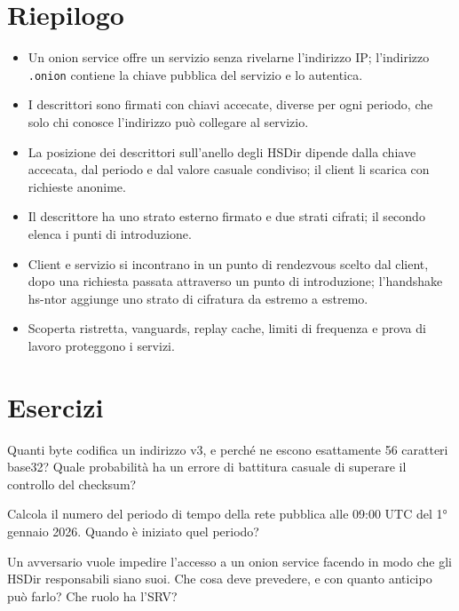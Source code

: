 \section*{Riepilogo}
\begin{itemize}
  \item Un onion service offre un servizio senza rivelarne l'indirizzo IP; l'indirizzo \texttt{.onion} contiene la chiave pubblica del servizio e lo autentica.
  \item I descrittori sono firmati con chiavi accecate, diverse per ogni periodo, che solo chi conosce l'indirizzo può collegare al servizio.
  \item La posizione dei descrittori sull'anello degli HSDir dipende dalla chiave accecata, dal periodo e dal valore casuale condiviso; il client li scarica con richieste anonime.
  \item Il descrittore ha uno strato esterno firmato e due strati cifrati; il secondo elenca i punti di introduzione.
  \item Client e servizio si incontrano in un punto di rendezvous scelto dal client, dopo una richiesta passata attraverso un punto di introduzione; l'handshake hs-ntor aggiunge uno strato di cifratura da estremo a estremo.
  \item Scoperta ristretta, vanguards, replay cache, limiti di frequenza e prova di lavoro proteggono i servizi.
\end{itemize}

\section*{Esercizi}

\begin{esercizio}[1]\label{es:14-indirizzo}
Quanti byte codifica un indirizzo v3, e perché ne escono esattamente 56 caratteri base32? Quale probabilità ha un errore di battitura casuale di superare il controllo del checksum?
\end{esercizio}

\begin{esercizio}[1]\label{es:14-periodo}
Calcola il numero del periodo di tempo della rete pubblica alle 09:00 UTC del 1° gennaio 2026. Quando è iniziato quel periodo?
\end{esercizio}

\begin{esercizio}[2]\label{es:14-hsdir}
Un avversario vuole impedire l'accesso a un onion service facendo in modo che gli HSDir responsabili siano suoi. Che cosa deve prevedere, e con quanto anticipo può farlo? Che ruolo ha l'SRV?
\end{esercizio}

